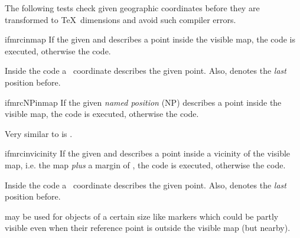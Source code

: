 The following tests check given geographic coordinates before they are
transformed to \TeX\ dimensions and avoid such compiler errors.

\begin{docCommand}{ifmrcinmap}{}
  If the given  and  describes a point
  inside the visible map, the  code is executed, otherwise
  the  code.\par
  Inside the  code a \tikzname\ coordinate 
  describes the given point. Also,  denotes the
  \emph{last} position before.
  \begin{dispListing}
  \end{dispListing}
\end{docCommand}

\begin{docCommand}{ifmrcNPinmap}{}
  If the given \emph{named position} (NP)  describes a point
  inside the visible map, the  code is executed, otherwise
  the  code.
  \begin{dispListing}
  \end{dispListing}
\end{docCommand}


Very similar to  is .

\begin{docCommand}{ifmrcinvicinity}{}
  If the given  and  describes a point
  inside a vicinity of the visible map, i.e. the map \emph{plus} a margin of ,
  the  code is executed, otherwise
  the  code.\par
  Inside the  code a \tikzname\ coordinate 
  describes the given point. Also,  denotes the
  \emph{last} position before.\par
   may be used for objects of a certain size like
  markers which could be partly visible even when their reference point
  is outside the visible map (but nearby).
\begin{dispListing}
\end{dispListing}
\end{docCommand}


